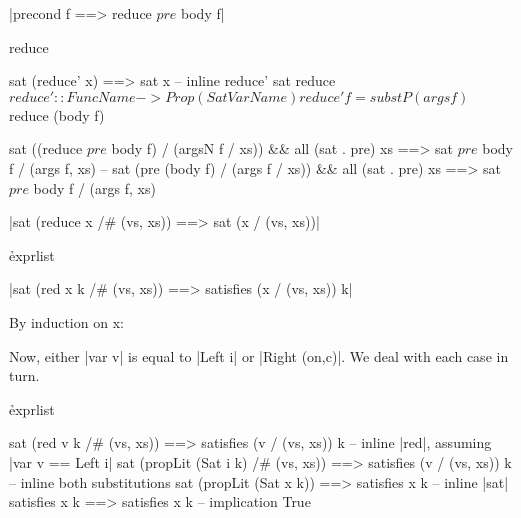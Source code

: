 

{|precond f ==> reduce $ pre $ body f|}



\ignore\begin{code}
reduce

sat (reduce' x) ==> sat x
    -- inline reduce'
sat reduce $
reduce' :: FuncName -> Prop (Sat VarName)
reduce' f = substP (args f) $ reduce (body f)




sat ((reduce $ pre $ body f) / (argsN f / xs)) && all (sat . pre) xs ==> sat $ pre $ body f / (args f, xs)
    -- 
sat (pre (body f) / (args f / xs)) && all (sat . pre) xs ==> sat $ pre $ body f / (args f, xs)
\end{code}






{|sat (reduce x /# (vs, xs)) ==> sat (x / (vs, xs))|}

\h{exprlist}

\ignore{}


{|sat (red x k /# (vs, xs)) ==> satisfies (x / (vs, xs)) k|}

By induction on x:


Now, either |var v| is equal to |Left i| or |Right (on,c)|. We deal with each case in turn.

\h{exprlist}\begin{code}
sat (red v k /# (vs, xs)) ==> satisfies (v / (vs, xs)) k
    -- inline |red|, assuming |var v == Left i|
sat (propLit (Sat i k) /# (vs, xs)) ==> satisfies (v / (vs, xs)) k
    -- inline both substitutions
sat (propLit (Sat x k)) ==> satisfies x k
    -- inline |sat|
satisfies x k ==> satisfies x k
    -- implication
True
\end{code}

